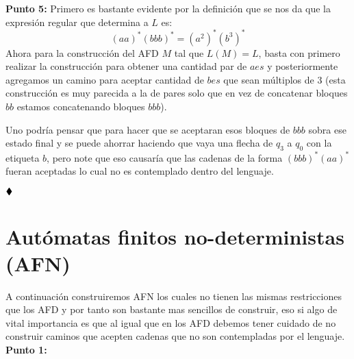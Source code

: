 \textbf{Punto 5:} Primero es bastante evidente por la definición que se nos da que la expresión regular que determina a $L$ es:
$$(aa)^*(bbb)^*=\left(a^2\right)^*\left(b^3\right)^*$$
Ahora para la construcción del AFD $M$ tal que $L(M)=L$, basta con primero realizar la construcción para obtener una cantidad par de $aes$ y posteriormente agregamos un camino para aceptar cantidad de $bes$ que sean múltiplos de $3$ (esta construcción es muy parecida a la de pares solo que en vez de concatenar bloques $bb$ estamos concatenando bloques $bbb$).
    \begin{center}
    \end{center}
    Uno podría pensar que para hacer que se aceptaran esos bloques de $bbb$ sobra ese estado final y se puede ahorrar haciendo que vaya una flecha de $q_3$ a $q_0$ con la etiqueta $b$, pero note que eso causaría que las cadenas de la forma $(bbb)^*(aa)^*$ fueran aceptadas lo cual no es contemplado dentro del lenguaje.
    
    $\hfill \blacklozenge$

    \section{Autómatas finitos no-deterministas (AFN)} 

  A continuación construiremos AFN los cuales no tienen las mismas restricciones que los AFD y por tanto son bastante mas sencillos de construir, eso si algo de vital importancia es que al igual que en los AFD debemos tener cuidado de no construir caminos que acepten cadenas que no son contempladas por el lenguaje.\\

  \textbf{Punto 1:}

